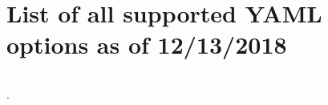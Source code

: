 \documentclass[10pt,oneside]{report}
\begin{document}
\section{List of all supported YAML options as of 12/13/2018}
\inputminted[]{yaml}{options.yaml}.


\end{document}
